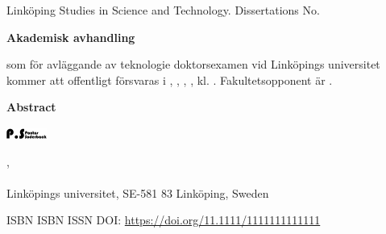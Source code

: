 \documentclass[12pt, a5paper]{article}
\begin{document}
\pagestyle{empty}

\begin{center}
\latexCalibri\fontsize{10}{12}\selectfont Linköping Studies in Science and Technology. Dissertations No. \Number

\latexTimesNewRoman\fontsize{14}{16.8}\selectfont\textbf{\MainTitleThesis}

\fontsize{11}{13.2}\selectfont \SecondaryTitleThesis

\latexTimesNewRoman\fontsize{14}{16.8}\selectfont \Author

\latexTimesNewRoman\fontsize{10}{12}\selectfont\textbf{Akademisk avhandling}
\end{center}
\latexTimesNewRoman\fontsize{9}{10.2}\selectfont
som för avläggande av teknologie doktorsexamen vid Linköpings uni\-versitet kommer att offentligt försvaras i \roomForDefence, \houseForDefence, \campusForDefence, \cityForDefence, \dateForDefence{ }kl. \clockForDefence. Fakultetsopponent är \opponentTitel{ }\opponent.

\begin{center}
\latexTimesNewRoman\fontsize{10}{12}\selectfont\textbf{Abstract}
\end{center}

\latexTimesNewRoman\fontsize{9}{10.2}\selectfont


\vfill
\begin{center}
\includegraphics[width=0.5\linewidth]{../Logos/blackLogo.pdf}
\end{center}

\begin{center}
\latexTimesNewRoman\fontsize{10}{12}\selectfont
\phdStudentDivisionSwedish,\\
\phdStudentDepartmentSwedish \\
Linköpings universitet, SE-581 83 Linköping, Sweden
\end{center}
\latexTimesNewRoman\fontsize{10}{12}\selectfont
ISBN \isbnPrint{ }\newline
ISBN \isbnPdf \newline 
ISSN \issn \newline
DOI: \href{https://doi.org/11.1111/1111111111111}{https://doi.org/11.1111/1111111111111}
\end{document}
